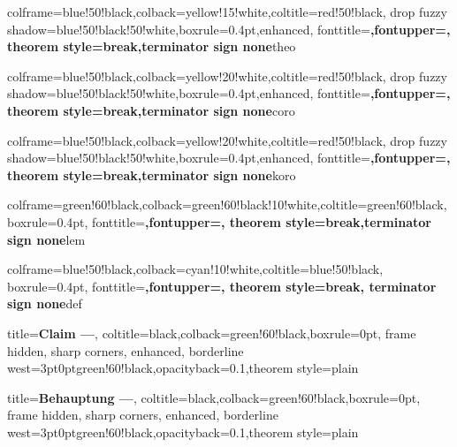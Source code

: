 \usepackage{tcolorbox}

%  
{colframe=blue!50!black,colback=yellow!15!white,coltitle=red!50!black,
drop fuzzy shadow=blue!50!black!50!white,boxrule=0.4pt,enhanced,
fonttitle=\upshape\bfseries,fontupper=\upshape,
theorem style=break,terminator sign none}{theo}

%
{colframe=blue!50!black,colback=yellow!20!white,coltitle=red!50!black,
drop fuzzy shadow=blue!50!black!50!white,boxrule=0.4pt,enhanced,
fonttitle=\upshape\bfseries,fontupper=\upshape,
theorem style=break,terminator sign none}{coro}

%
{colframe=blue!50!black,colback=yellow!20!white,coltitle=red!50!black,
drop fuzzy shadow=blue!50!black!50!white,boxrule=0.4pt,enhanced,
fonttitle=\upshape\bfseries,fontupper=\upshape,
theorem style=break,terminator sign none}{koro}

%
{colframe=green!60!black,colback=green!60!black!10!white,coltitle=green!60!black,
boxrule=0.4pt,
fonttitle=\upshape\bfseries,fontupper=\upshape,
theorem style=break,terminator sign none}{lem}

%
{colframe=blue!50!black,colback=cyan!10!white,coltitle=blue!50!black,
boxrule=0.4pt,
fonttitle=\upshape\bfseries,fontupper=\upshape,
theorem style=break, terminator sign none}{def}

%
{title=\textbf{\textcolor{green!60!black}{Claim ---}}, coltitle=black,colback=green!60!black,boxrule=0pt,
frame hidden, sharp corners, enhanced,
borderline west={3pt}{0pt}{green!60!black},opacityback=0.1,theorem style=plain}

%
{title=\textbf{\textcolor{green!60!black}{Behauptung ---}}, coltitle=black,colback=green!60!black,boxrule=0pt,
frame hidden, sharp corners, enhanced,
borderline west={3pt}{0pt}{green!60!black},opacityback=0.1,theorem style=plain}

